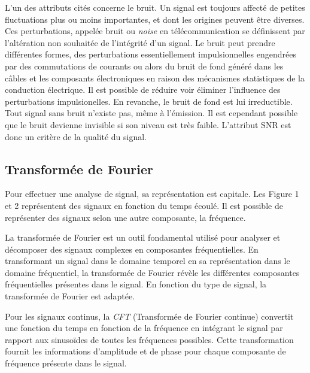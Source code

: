 L'un des attributs cités concerne le bruit. Un signal est toujours affecté de petites fluctuations plus ou moins importantes, et dont les origines peuvent être diverses. Ces perturbations, appelée bruit ou \textit{noise} en télécommunication se définissent par l'altération non souhaitée de l'intégrité d'un signal. Le bruit peut prendre différentes formes, des perturbations essentiellement impulsionnelles engendrées par des commutations de courants ou alors du bruit de fond généré dans les câbles et les composants électroniques en raison
des mécanismes statistiques de la conduction électrique. Il est possible de réduire voir éliminer l'influence des perturbations impulsionelles. En revanche, le bruit de fond est lui irreductible. Tout signal sans bruit n'existe pas, même à l'émission. Il est cependant possible que le bruit devienne invisible si son niveau est très faible. L'attribut SNR est donc un critère de la qualité du signal.


\subsection{Transformée de Fourier}

Pour effectuer une analyse de signal, sa représentation est capitale. Les Figure 1 et 2 représentent des signaux en fonction du temps écoulé. Il est possible de représenter des signaux selon une autre composante, la fréquence.

\vspace{0.1cm}

La transformée de Fourier est un outil fondamental utilisé pour analyser et décomposer des signaux complexes en composantes fréquentielles. En transformant un signal dans le domaine temporel en sa représentation dans le domaine fréquentiel, la transformée de Fourier révèle les différentes composantes fréquentielles présentes dans le signal. En fonction du type de signal, la transformée de Fourier est adaptée.

\vspace{0.1cm}

Pour les signaux continus, la \textit{CFT} (Transformée de Fourier continue) convertit une fonction du temps en fonction de la fréquence en intégrant le signal par rapport aux sinusoïdes de toutes les fréquences possibles. Cette transformation fournit les informations d'amplitude et de phase pour chaque composante de fréquence présente dans le signal.

\vspace{0.1cm}


